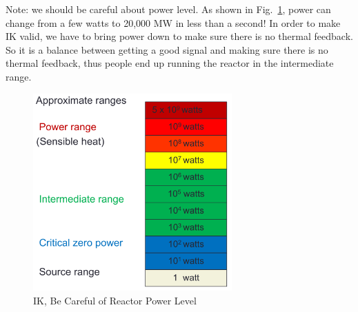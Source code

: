 \documentclass{school-22.211-notes}
\begin{document}
Note: we should be careful about power level. As shown in Fig.~\ref{power-range}, power can change from a few watts to 20,000 MW in less than a second! In order to make IK valid, we have to bring power down to make sure there is no thermal feedback. So it is a balance between getting a good signal and making sure there is no thermal feedback, thus people end up running the reactor in the intermediate range. 
\begin{figure}[ht]
  \centering
  \includegraphics[width=3in]{images/pke/power-range.png}
  \caption{IK, Be Careful of Reactor Power Level} \label{power-range}
\end{figure}
\end{document}
